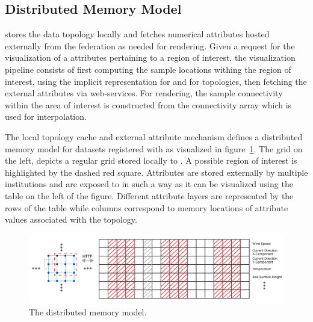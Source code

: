 \subsection{Distributed Memory Model}
\sciwms{} stores the data topology locally and fetches numerical
attributes hosted externally from the federation as needed for
rendering. Given a request for the visualization of a attributes
pertaining to a region of interest, the visualization pipeline
consists of first computing the sample locations withing the region of
interest, using the implicit representation for \cgrid{} and \rtree{}
for \ugrid{} topologies, then fetching the external attributes via
\ogc{} web-services. For rendering, the sample connectivity within the
area of interest is constructed from the connectivity array which is
used for interpolation.

The local topology cache and external attribute mechanism defines a
distributed memory model for datasets registered with \sciwms{} as
visualized in figure~\ref{fig:sciwms_mem_model}. The grid on the left,
depicts a regular grid stored locally to \sciwms{}. A possible region
of interest is highlighted by the dashed red square. Attributes are
stored externally by multiple institutions and are exposed to
\sciwms{} in such a way as it can be visualized using the table on the
left of the figure. Different attribute layers are represented by the
rows of the table while columns correspond to memory locations of
attribute values associated with the topology. %
\begin{figure}[ht!]
  \centering
  \includegraphics[width=\textwidth]{../figs/topology_memModel}
  \caption{The \sciwms{} distributed memory model.}
  \label{fig:sciwms_mem_model}
\end{figure}
